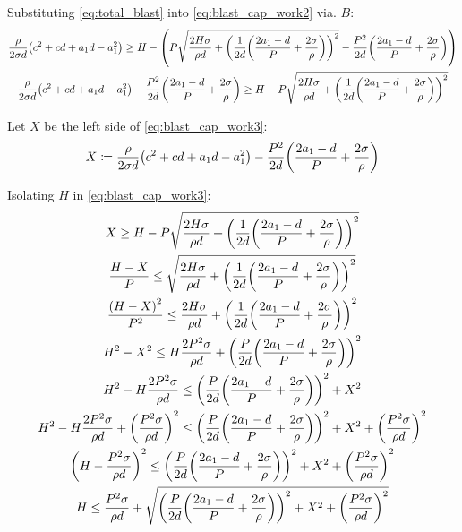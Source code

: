 \documentclass{article}
\begin{document}
Substituting \eqref{eq:total_blast} into \eqref{eq:blast_cap_work2} via. $B$:
\begin{gather}
    \frac{\rho}{2 \sigma d} \parens*{c^2 + c d + a_1 d - a_1^2}
    \ge
    H
    - \parens*{
        P \sqrt{
            \frac{2 H \sigma}{\rho d}
            + \parens*{\frac{1}{2d} \parens*{\frac{2 a_1 - d}{P} + \frac{2 \sigma}{\rho}}}^2
        }
        - \frac{P^2}{2d} \parens*{\frac{2 a_1 - d}{P} + \frac{2 \sigma}{\rho}}
    }
    \\
    \frac{\rho}{2 \sigma d} \parens*{c^2 + c d + a_1 d - a_1^2}
    - \frac{P^2}{2d} \parens*{\frac{2 a_1 - d}{P} + \frac{2 \sigma}{\rho}}
    \ge
    H
    - P \sqrt{
        \frac{2 H \sigma}{\rho d}
        + \parens*{\frac{1}{2d} \parens*{\frac{2 a_1 - d}{P} + \frac{2 \sigma}{\rho}}}^2
    }
    \label{eq:blast_cap_work3}
\end{gather}

Let $X$ be the left side of \eqref{eq:blast_cap_work3}:
\begin{equation}
    X
    \coloneqq
    \frac{\rho}{2 \sigma d} \parens*{c^2 + c d + a_1 d - a_1^2}
    - \frac{P^2}{2d} \parens*{\frac{2 a_1 - d}{P} + \frac{2 \sigma}{\rho}}
    \label{eq:anonymous_capitalx}
\end{equation}

Isolating $H$ in \eqref{eq:blast_cap_work3}:
\begin{gather}
    X
    \ge
    H
    - P \sqrt{
        \frac{2 H \sigma}{\rho d}
        + \parens*{\frac{1}{2d} \parens*{\frac{2 a_1 - d}{P} + \frac{2 \sigma}{\rho}}}^2
    }
    \\
    \frac{H - X}{P} 
    \le
    \sqrt{
        \frac{2 H \sigma}{\rho d}
        + \parens*{\frac{1}{2d} \parens*{\frac{2 a_1 - d}{P} + \frac{2 \sigma}{\rho}}}^2
    }
    \\
    \frac{\parens*{H - X}^2}{P^2} 
    \le
    \frac{2 H \sigma}{\rho d}
    + \parens*{\frac{1}{2d} \parens*{\frac{2 a_1 - d}{P} + \frac{2 \sigma}{\rho}}}^2
    \\
    H^2 - X^2
    \le
    H \frac{2 P^2 \sigma}{\rho d}
    + \parens*{\frac{P}{2d} \parens*{\frac{2 a_1 - d}{P} + \frac{2 \sigma}{\rho}}}^2
    \\
    H^2
    - H \frac{2 P^2 \sigma}{\rho d}
    \le
    \parens*{\frac{P}{2d} \parens*{\frac{2 a_1 - d}{P} + \frac{2 \sigma}{\rho}}}^2
    + X^2
    \\
    H^2
    - H \frac{2 P^2 \sigma}{\rho d}
    + \parens*{\frac{P^2 \sigma}{\rho d}}^2
    \le
    \parens*{\frac{P}{2d} \parens*{\frac{2 a_1 - d}{P} + \frac{2 \sigma}{\rho}}}^2
    + X^2
    + \parens*{\frac{P^2 \sigma}{\rho d}}^2
    \\
    \parens*{H - \frac{P^2 \sigma}{\rho d}}^2
    \le
    \parens*{\frac{P}{2d} \parens*{\frac{2 a_1 - d}{P} + \frac{2 \sigma}{\rho}}}^2
    + X^2
    + \parens*{\frac{P^2 \sigma}{\rho d}}^2
    \\
    H
    \le
    \frac{P^2 \sigma}{\rho d}
    + \sqrt{
        \parens*{\frac{P}{2d} \parens*{\frac{2 a_1 - d}{P} + \frac{2 \sigma}{\rho}}}^2
        + X^2
        + \parens*{\frac{P^2 \sigma}{\rho d}}^2
    }
\end{gather}
\end{document}
